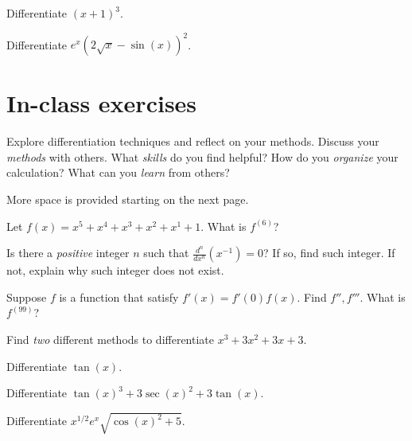 \documentclass[../main.tex]{subfiles}
\begin{document}
\begin{example}
  Differentiate \((x+1)^{3}\).
\end{example}


\clearpage

\begin{example}
  Differentiate \(e^{x}(2\sqrt{x} - \sin(x))^{2}\).
\end{example}
\clearpage

\section{In-class exercises}
Explore differentiation techniques and reflect on your methods. Discuss your \emph{methods} with others. What \emph{skills} do you find helpful? How do you \emph{organize} your calculation? What can you \emph{learn} from others?

More space is provided starting on the next page.

\bigskip
\begin{example}
  Let \(f(x) = x^{5} + x^{4} + x^{3} + x^{2} + x^{1} + 1\). What is \(f^{(6)}\)?
\end{example}

\bigskip
\begin{example}
  Is there a \emph{positive} integer \(n\) such that \(\frac{d^{n}}{dx^{n}} \left( x^{-1} \right) = 0\)? If so, find such integer. If not, explain why such integer does not exist.
\end{example}

\bigskip

\begin{example}
  Suppose \(f\) is a function that satisfy \(f'(x) = f'(0) f(x)\). Find \(f'', f'''\). What is \(f^{(99)}\)?
\end{example}

\bigskip
\begin{example}
  Find \emph{two} different methods to differentiate \(x^{3} + 3x^{2} + 3x + 3\).
\end{example}

\bigskip
\begin{example}
  Differentiate \(\tan(x)\). 
\end{example}

\bigskip
\begin{example}
  Differentiate \(\tan(x)^{3} + 3 \sec(x)^{2} + 3\tan(x)\). 
\end{example}

\bigskip
\begin{example}
  Differentiate \(x^{1/2} e^{x} \sqrt{\cos(x)^{2} + 5}\).
\end{example}
\bigskip
\end{document}
